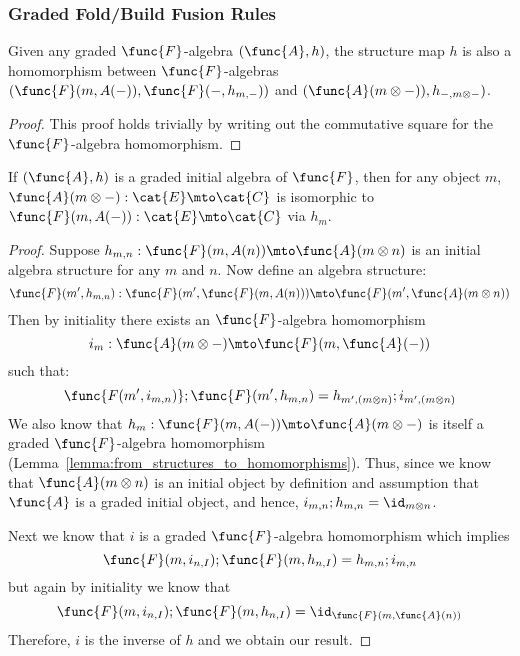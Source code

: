 \subsubsection{Graded Fold/Build Fusion Rules}
\label{subsubsec:graded_fold_build_fusion_rules}
\begin{lemma}
    \label{lemma:from_structures_to_homomorphisms}
    Given any graded $\func{F}$-algebra $(\func{A},h)$, the structure map
    $h$ is also a homomorphism between $\func{F}$-algebras
    $(\func{F}(m,A(-)),\func{F}(-,h_{m,-}))$ and $(\func{A}(m \otimes -)),h_{-, m \otimes -})$.
    \end{lemma}
    \begin{proof}
    This proof holds trivially by writing out the commutative square for
    the $\func{F}$-algebra homomorphism.
    \end{proof}
    
    \begin{lemma}
    \label{lemma:graded_lambeks_lemma}
    If $(\func{A},h)$ is a graded initial algebra of $\func{F}$, 
    then for any object $m$, 
    $\func{A}(m \otimes -) : \cat{E} \mto \cat{C}$ is isomorphic to 
    $\func{F}(m, A(-)) : \cat{E} \mto \cat{C}$ via $h_m$.
    \end{lemma}
    \begin{proof}
    Suppose $h_{m,n} : \func{F}(m,A(n)) \mto \func{A}(m \otimes n)$ is an initial
    algebra structure for any $m$ and $n$.  
    Now define an algebra structure:
    \[
    \func{F}(m',h_{m,n}) : \func{F}(m',\func{F}(m,A(n))) \mto \func{F}(m',\func{A}(m \otimes n))
    \]
    Then by initiality there exists an $\func{F}$-algebra homomorphism 
    $$i_{m} : \func{A}(m \otimes -) \mto \func{F}(m,\func{A}(-))$$ such that:
    $$\func{F(m',i_{m,n})} ; \func{F}(m',h_{m,n}) = h_{m',(m \otimes n)} ;
    i_{m',(m \otimes n)}$$
    We also know that $h_{m} : \func{F}(m,A(-)) \mto \func{A}(m \otimes -)$ is
    itself a graded $\func{F}$-algebra homomorphism
    (Lemma~\ref{lemma:from_structures_to_homomorphisms}). Thus, since we
    know that $\func{A}(m \otimes n)$ is an initial object by definition and
    assumption that $\func{A}$ is a graded initial object, and hence, 
    $i_{m,n}; h_{m,n} = \id_{m \otimes n}$.  
    
    Next we know that $i$ is a graded $\func{F}$-algebra homomorphism which
    implies $$\func{F}(m,i_{n,I});\func{F}(m,h_{n,I}) =
    h_{m,n};i_{m,n}$$ but again by initiality we know that
    $$\func{F}(m,i_{n,I});\func{F}(m,h_{n,I}) =
    \id_{\func{F}(m,\func{A}(n))}$$
    Therefore, $i$ is the inverse of $h$ and we obtain our result.
    \end{proof}
    
